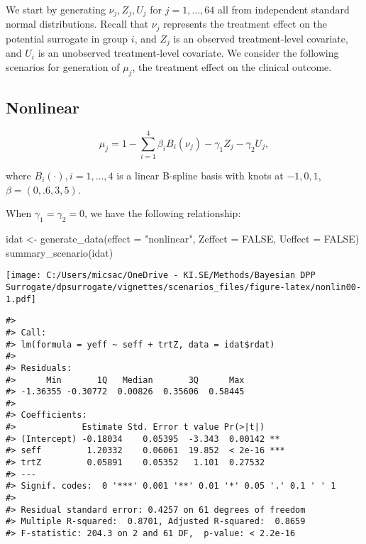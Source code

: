 \documentclass[
]{article}
\newenvironment{Shaded}{\begin{snugshade}}{\end{snugshade}}
\newcommand{\AttributeTok}[1]{\textcolor[rgb]{0.77,0.63,0.00}{#1}}
\newcommand{\ConstantTok}[1]{\textcolor[rgb]{0.00,0.00,0.00}{#1}}
\newcommand{\FunctionTok}[1]{\textcolor[rgb]{0.00,0.00,0.00}{#1}}
\newcommand{\NormalTok}[1]{#1}
\newcommand{\OtherTok}[1]{\textcolor[rgb]{0.56,0.35,0.01}{#1}}
\newcommand{\StringTok}[1]{\textcolor[rgb]{0.31,0.60,0.02}{#1}}
\begin{document}
We start by generating \(\nu_j, Z_j, U_j\) for \(j = 1, \ldots, 64\) all
from independent standard normal distributions. Recall that \(\nu_j\)
represents the treatment effect on the potential surrogate in group
\(i\), and \(Z_j\) is an observed treatment-level covariate, and \(U_i\)
is an unobserved treatment-level covariate. We consider the following
scenarios for generation of \(\mu_j\), the treatment effect on the
clinical outcome.

\hypertarget{nonlinear}{%
\subsection{Nonlinear}\label{nonlinear}}

\[\mu_j = 1 - \sum_{i = 1}^4 \beta_i B_i(\nu_j) - \gamma_1 Z_j - \gamma_2 U_j,\]

where \(B_i(\cdot), i = 1, \ldots, 4\) is a linear B-spline basis with
knots at \(-1, 0, 1\), \(\beta = (0, .6, 3, 5)\).

When \(\gamma_1 = \gamma_2 = 0\), we have the following relationship:

\begin{Shaded}
\begin{Highlighting}[]
\NormalTok{idat }\OtherTok{\textless{}{-}} \FunctionTok{generate\_data}\NormalTok{(}\AttributeTok{effect =} \StringTok{"nonlinear"}\NormalTok{, }\AttributeTok{Zeffect =} \ConstantTok{FALSE}\NormalTok{, }\AttributeTok{Ueffect =} \ConstantTok{FALSE}\NormalTok{)}
\FunctionTok{summary\_scenario}\NormalTok{(idat)}
\end{Highlighting}
\end{Shaded}

\texttt{[image: C:/Users/micsac/OneDrive - KI.SE/Methods/Bayesian DPP Surrogate/dpsurrogate/vignettes/scenarios\_files/figure-latex/nonlin00-1.pdf]}

\begin{verbatim}
#> 
#> Call:
#> lm(formula = yeff ~ seff + trtZ, data = idat$rdat)
#> 
#> Residuals:
#>      Min       1Q   Median       3Q      Max 
#> -1.36355 -0.30772  0.00826  0.35606  0.58445 
#> 
#> Coefficients:
#>             Estimate Std. Error t value Pr(>|t|)    
#> (Intercept) -0.18034    0.05395  -3.343  0.00142 ** 
#> seff         1.20332    0.06061  19.852  < 2e-16 ***
#> trtZ         0.05891    0.05352   1.101  0.27532    
#> ---
#> Signif. codes:  0 '***' 0.001 '**' 0.01 '*' 0.05 '.' 0.1 ' ' 1
#> 
#> Residual standard error: 0.4257 on 61 degrees of freedom
#> Multiple R-squared:  0.8701, Adjusted R-squared:  0.8659 
#> F-statistic: 204.3 on 2 and 61 DF,  p-value: < 2.2e-16
\end{verbatim}
\end{document}
